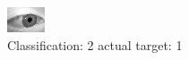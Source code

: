 \begin{figure}[h!]
\begin{center}
\includegraphics[width=0.60\columnwidth]{figures/ID2757_class_2_target_1.png}
\end{center}
\caption{ Classification: 2 actual target: 1}
\label{fig:ID2757_class_2_target_1}
\end{figure}

